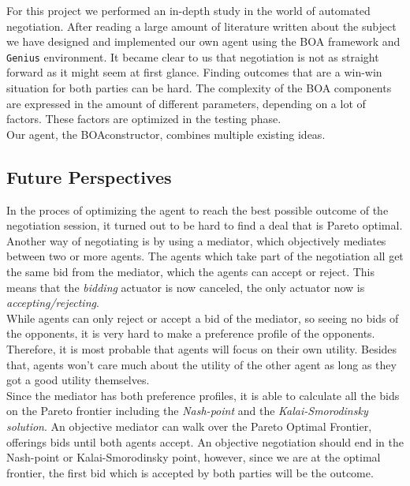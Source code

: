 
For this project we performed an in-depth study in the world of automated negotiation. After reading a large amount of literature written about the subject we have designed and implemented our own agent using the BOA framework and \texttt{Genius} environment. It became clear to us that negotiation is not as straight forward as it might seem at first glance. Finding outcomes that are a win-win situation for both parties can be hard. The complexity of the BOA components are expressed in the amount of different parameters, depending on a lot of factors. These factors are optimized in the testing phase.  \\

Our agent, the BOAconstructor, combines multiple existing ideas. 

\subsection{Future Perspectives}
In the proces of optimizing the agent to reach the best possible outcome of the negotiation session, it turned out to be hard to find a deal that is Pareto optimal. Another way of negotiating is by using a mediator, which objectively mediates between two or more agents. The agents which take part of the negotiation all get the same bid from the mediator, which the agents can accept or reject. This means that the \textit{bidding} actuator is now canceled, the only actuator now is \textit{accepting/rejecting}.\\

While agents can only reject or accept a bid of the mediator, so seeing no bids of the opponents, it is very hard to make a preference profile of the opponents. Therefore, it is most probable that agents will focus on their own utility. Besides that, agents won't care much about the utility of the other agent as long as they got a good utility themselves.  \\

Since the mediator has both preference profiles, it is able to calculate all the bids on the Pareto frontier including the \textit{Nash-point} and the \textit{Kalai-Smorodinsky solution}. An objective mediator can walk over the Pareto Optimal Frontier, offerings bids until both agents accept. An objective negotiation should end in the Nash-point or Kalai-Smorodinsky point, however, since we are at the optimal frontier, the first bid which is accepted by both parties will be the outcome. \\

